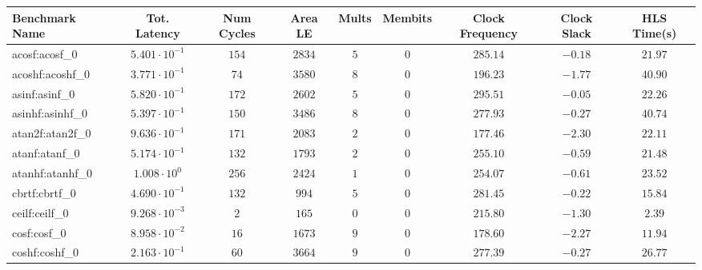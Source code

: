 \begin{tabular}{|l|c|c|c|c|c|c|c|c|}
\hline
Benchmark Name               & Tot. Latency            & Num Cycles & Area LE   & Mults   & Membits & Clock Frequency & Clock Slack & HLS Time(s) \\
\hline
acosf:acosf\_0               & $ 5.401 \cdot 10^{-1} $ & $ 154    $ & $ 2834  $ & $ 5   $ & $ 0   $ & $ 285.14      $ & $ -0.18   $ & $ 21.97   $ \\
acoshf:acoshf\_0             & $ 3.771 \cdot 10^{-1} $ & $ 74     $ & $ 3580  $ & $ 8   $ & $ 0   $ & $ 196.23      $ & $ -1.77   $ & $ 40.90   $ \\
asinf:asinf\_0               & $ 5.820 \cdot 10^{-1} $ & $ 172    $ & $ 2602  $ & $ 5   $ & $ 0   $ & $ 295.51      $ & $ -0.05   $ & $ 22.26   $ \\
asinhf:asinhf\_0             & $ 5.397 \cdot 10^{-1} $ & $ 150    $ & $ 3486  $ & $ 8   $ & $ 0   $ & $ 277.93      $ & $ -0.27   $ & $ 40.74   $ \\
atan2f:atan2f\_0             & $ 9.636 \cdot 10^{-1} $ & $ 171    $ & $ 2083  $ & $ 2   $ & $ 0   $ & $ 177.46      $ & $ -2.30   $ & $ 22.11   $ \\
atanf:atanf\_0               & $ 5.174 \cdot 10^{-1} $ & $ 132    $ & $ 1793  $ & $ 2   $ & $ 0   $ & $ 255.10      $ & $ -0.59   $ & $ 21.48   $ \\
atanhf:atanhf\_0             & $ 1.008 \cdot 10^{0}  $ & $ 256    $ & $ 2424  $ & $ 1   $ & $ 0   $ & $ 254.07      $ & $ -0.61   $ & $ 23.52   $ \\
cbrtf:cbrtf\_0               & $ 4.690 \cdot 10^{-1} $ & $ 132    $ & $ 994   $ & $ 5   $ & $ 0   $ & $ 281.45      $ & $ -0.22   $ & $ 15.84   $ \\
ceilf:ceilf\_0               & $ 9.268 \cdot 10^{-3} $ & $ 2      $ & $ 165   $ & $ 0   $ & $ 0   $ & $ 215.80      $ & $ -1.30   $ & $ 2.39    $ \\
cosf:cosf\_0                 & $ 8.958 \cdot 10^{-2} $ & $ 16     $ & $ 1673  $ & $ 9   $ & $ 0   $ & $ 178.60      $ & $ -2.27   $ & $ 11.94   $ \\
coshf:coshf\_0               & $ 2.163 \cdot 10^{-1} $ & $ 60     $ & $ 3664  $ & $ 9   $ & $ 0   $ & $ 277.39      $ & $ -0.27   $ & $ 26.77   $ \\

\end{tabular}
